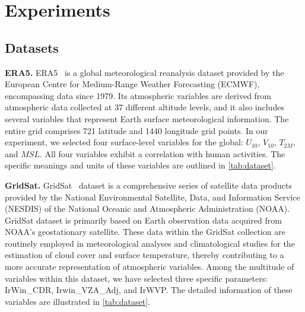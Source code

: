 \section{Experiments}

\subsection{Datasets}
\textbf{ERA5.} ERA5~\cite{hersbach2020era5} is a global meteorological reanalysis dataset provided by the European Centre for Medium-Range Weather Forecasting (ECMWF), encompassing data since 1979. 
Its atmospheric variables are derived from atmospheric data collected at 37 different altitude levels, and it also includes several variables that represent Earth surface meteorological information. 
The entire grid comprises 721 latitude and 1440 longitude grid points. 
In our experiment, we selected four surface-level variables for the global: $U_{10}$, $V_{10}$, $T_{2M}$, and $MSL$. 
All four variables exhibit a correlation with human activities.
The specific meanings and units of these variables are outlined in \cref{tab:dataset}. 

\noindent\textbf{GridSat.} GridSat~\cite{skofronick2015global} dataset is a comprehensive series of satellite data products provided by the National Environmental Satellite, Data, and Information Service (NESDIS) of the National Oceanic and Atmospheric Administration (NOAA).  
GridSat dataset is primarily based on Earth observation data acquired from NOAA's geostationary satellite. 
These data within the GridSat collection are routinely employed in meteorological analyses and climatological studies for the estimation of cloud cover and surface temperature, thereby contributing to a more accurate representation of atmospheric variables. 
Among the multitude of variables within this dataset, we have selected three specific parameters: IrWin\_CDR, Irwin\_VZA\_Adj, and IrWVP. 
The detailed information of these variables are illustrated in \cref{tab:dataset}.

